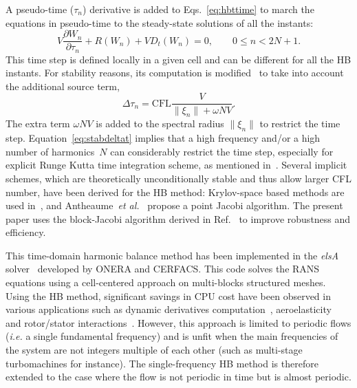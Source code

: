 A pseudo-time ($\tau_n$) derivative is added to
Eqs.~\eqref{eq:hbttime} to march the equations in pseudo-time to the
steady-state solutions of all the instants:
\begin{equation}
  \label{eq:pseudohbttime}
  V\frac{\partial W_n}{\partial\tau_n} + R(W_n)+VD_t(W_n)=0, \quad \quad
  0 \leq n < 2N+1.
\end{equation}
This time step is defined locally in a given cell and can
  be different for all the HB instants. For stability reasons, its
computation is modified~\cite{Weide2005} to take into account
the additional source term,
\begin{equation}
  \label{eq:stabdeltat}
  \Delta\tau_n=\text{CFL}\frac{V}{\|\xi_n\|+\omega NV}.
\end{equation}
The extra term $\omega NV$ is added to the spectral radius $\|\xi_n\|$ to
restrict the time step.  Equation~\eqref{eq:stabdeltat} implies that a
high frequency and/or a high number of harmonics~$N$ can considerably
restrict the time step, especially for explicit Runge Kutta time
integration scheme, as mentioned in~\cite{Hall2002}. %
Several implicit schemes, which are theoretically unconditionally stable and thus allow larger
CFL number, have been derived for the HB method: Krylov-space based
methods are used
in~\cite{FLD:FLD2111,woodgate09:_implic_harmon_balan_solver_for}, and
Antheaume~\emph{et
  al.}~\cite{antheaume11:_implic_time_spect_method_for} propose a
point Jacobi algorithm. The present paper uses the block-Jacobi
algorithm derived in Ref.~\cite{Sicot2008} to improve robustness and
efficiency.

This time-domain harmonic balance method has been implemented in the
\emph{elsA} solver~\cite{cambier2012} developed by ONERA and
CERFACS. This code solves the RANS equations using a cell-centered
approach on multi-blocks structured meshes.  Using the HB method, significant savings in
CPU cost have been observed in various applications such as dynamic
derivatives computation~\cite{Hassan2011},
aeroelasticity~\cite{Dufour2010} and rotor/stator
interactions~\cite{Sicot2012}. However, this approach is limited to
periodic flows (\emph{i.e.} a single fundamental frequency) and is
unfit when the main frequencies of the system are not integers multiple
of each other (such as multi-stage turbomachines for instance). The single-frequency HB method is therefore
extended to the case where the flow is not periodic in time but is
almost periodic.


